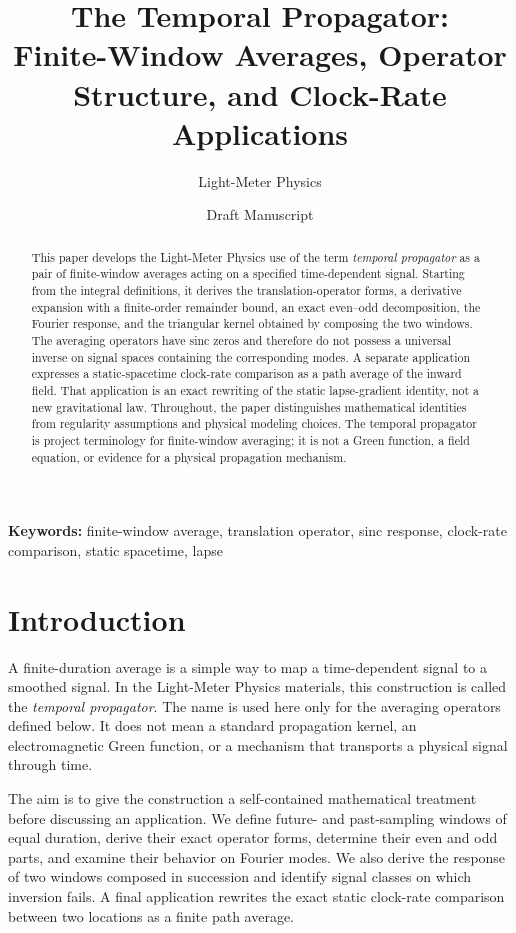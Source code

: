 \documentclass[12pt]{article}
\title{The Temporal Propagator:\\
Finite-Window Averages, Operator Structure, and Clock-Rate Applications}
\author{Light-Meter Physics}
\date{Draft Manuscript}
\begin{document}
\maketitle

\begin{abstract}
This paper develops the Light-Meter Physics use of the term \emph{temporal propagator} as a pair of finite-window averages acting on a specified time-dependent signal. Starting from the integral definitions, it derives the translation-operator forms, a derivative expansion with a finite-order remainder bound, an exact even--odd decomposition, the Fourier response, and the triangular kernel obtained by composing the two windows. The averaging operators have sinc zeros and therefore do not possess a universal inverse on signal spaces containing the corresponding modes. A separate application expresses a static-spacetime clock-rate comparison as a path average of the inward field. That application is an exact rewriting of the static lapse-gradient identity, not a new gravitational law. Throughout, the paper distinguishes mathematical identities from regularity assumptions and physical modeling choices. The temporal propagator is project terminology for finite-window averaging; it is not a Green function, a field equation, or evidence for a physical propagation mechanism.
\end{abstract}

\noindent\textbf{Keywords:} finite-window average, translation operator, sinc response, clock-rate comparison, static spacetime, lapse

\section{Introduction}

A finite-duration average is a simple way to map a time-dependent signal to a smoothed signal. In the Light-Meter Physics materials, this construction is called the \emph{temporal propagator}. The name is used here only for the averaging operators defined below. It does not mean a standard propagation kernel, an electromagnetic Green function, or a mechanism that transports a physical signal through time.

The aim is to give the construction a self-contained mathematical treatment before discussing an application. We define future- and past-sampling windows of equal duration, derive their exact operator forms, determine their even and odd parts, and examine their behavior on Fourier modes. We also derive the response of two windows composed in succession and identify signal classes on which inversion fails. A final application rewrites the exact static clock-rate comparison between two locations as a finite path average.
\end{document}
